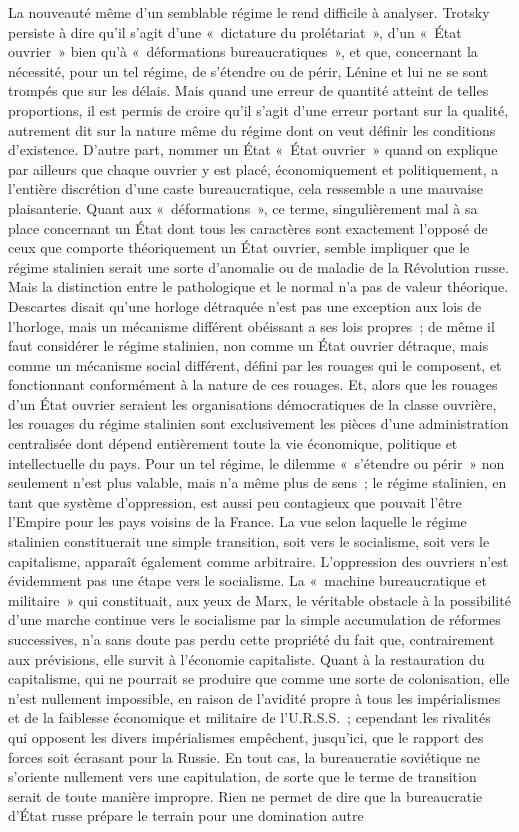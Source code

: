 \documentclass[french,twoside]{book} %
\begin{document}
La nouveauté même d'un semblable régime le rend difficile à analyser. Trotsky persiste à dire qu'il s'agit d'une « dictature du prolétariat », d'un « État ouvrier » bien qu'à « déformations bureaucratiques », et que, concernant la nécessité, pour un tel régime, de s'étendre ou de périr, Lénine et lui ne se sont trompés que sur les délais. Mais quand une erreur de quantité atteint de telles proportions, il est permis de croire qu'il s'agit d'une erreur portant sur la qualité, autrement dit sur la nature même du régime dont on veut définir les conditions d'existence. D'autre part, nommer un État « État ouvrier » quand on explique par ailleurs que chaque ouvrier y est placé, économiquement et politiquement, a l'entière discrétion d'une caste bureaucratique, cela ressemble a une mauvaise plaisanterie. Quant aux « déformations », ce terme, singulièrement mal à sa place concernant un État dont tous les caractères sont exactement l'opposé de ceux que comporte théoriquement un État ouvrier, semble impliquer que le régime stalinien serait une sorte d'anomalie ou de maladie de la Révolution russe. Mais la distinction entre le pathologique et le normal n'a pas de valeur théorique. Descartes disait qu'une horloge détraquée n'est pas une exception aux lois de l'horloge, mais un mécanisme différent obéissant a ses lois propres ; de même il faut considérer le régime stalinien, non comme un État ouvrier détraque, mais comme un mécanisme social différent, défini par les rouages qui le composent, et fonctionnant conformément à la nature de ces rouages. Et, alors que les rouages d'un État ouvrier seraient les organisations démocratiques de la classe ouvrière, les rouages du régime stalinien sont exclusivement les pièces d'une administration centralisée dont dépend entièrement toute la vie économique, politique et intellectuelle du pays. Pour un tel régime, le dilemme « s'étendre ou périr » non seulement n'est plus valable, mais n'a même plus de sens ; le régime stalinien, en tant que système d'oppression, est aussi peu contagieux que pouvait l'être l'Empire pour les pays voisins de la France. La vue selon laquelle le régime stalinien constituerait une simple transition, soit vers le socialisme, soit vers le capitalisme, apparaît également comme arbitraire. L'oppression des ouvriers n'est évidemment pas une étape vers le socialisme. La « machine bureaucratique et militaire » qui constituait, aux yeux de Marx, le véritable obstacle à la possibilité d'une marche continue vers le socialisme par la simple accumulation de réformes successives, n'a sans doute pas perdu cette propriété du fait que, contrairement aux prévisions, elle survit à l'économie capitaliste. Quant à la restauration du capitalisme, qui ne pourrait se produire que comme une sorte de colonisation, elle n'est nullement impossible, en raison de l'avidité propre à tous les impérialismes et de la faiblesse économique et militaire de l'U.R.S.S. ; cependant les rivalités qui opposent les divers impérialismes empêchent, jusqu'ici, que le rapport des forces soit écrasant pour la Russie. En tout cas, la bureaucratie soviétique ne s'oriente nullement vers une capitulation, de sorte que le terme de transition serait de toute manière impropre. Rien ne permet de dire que la bureaucratie d'État russe prépare le terrain pour une domination autre 
\end{document}
